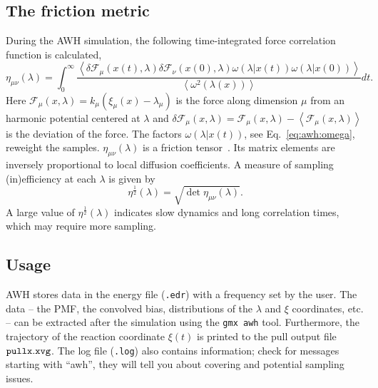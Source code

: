 \subsection{The friction metric}\label{sec:awh:friction}
During the AWH simulation, the following time-integrated force correlation function is calculated,
\newcommand{\av}[1]{\left<{#1}\right>}
\begin{equation} \label{eq:awh:metric}
\eta_{\mu\nu}(\lambda) =
\int_0^\infty
\frac{
\av{\delta \mathcal{F}_{\mu}(x(t),\lambda)
\delta \mathcal{F}_\nu(x(0),\lambda)
\omega(\lambda|x(t)) \omega(\lambda|x(0))}}
{\av{\omega^2(\lambda(x))}}
dt.
\end{equation}
Here $\mathcal F_\mu(x,\lambda) = k_\mu (\xi_\mu(x) - \lambda_\mu)$ 
is the force along dimension $\mu$ from an harmonic potential centered at $\lambda$
and $\delta \mathcal F_\mu(x,\lambda) = \mathcal F_\mu(x,\lambda) - \av{\mathcal F_\mu(x,\lambda)}$
is the deviation of the force.
The factors $\omega(\lambda|x(t))$, see Eq.~\ref{eq:awh:omega}, reweight the samples.
$\eta_{\mu\nu}(\lambda)$ is a friction tensor~\cite{sivak2012thermodynamic}.
Its matrix elements are inversely proportional to local diffusion coefficients.
A measure of sampling (in)efficiency at each $\lambda$ is given by
\begin{equation}\label{eq:awh:sqrt-metric}
\eta^{\frac{1}{2}}(\lambda) = \sqrt{\det\eta_{\mu\nu}(\lambda)}.
\end{equation}
A large value of  $\eta^{\frac{1}{2}}(\lambda)$ indicates slow dynamics and long correlation times,
which may require more sampling.

\subsection{Usage}\label{sec:awh:usage}

AWH stores data in the energy file ({\tt .edr}) with a frequency set by the user.
The data -- the PMF, the convolved bias, distributions of the $\lambda$ and $\xi$ coordinates, etc. -- 
can be extracted after the simulation using the {\tt gmx awh} tool.
Furthermore, the trajectory of the reaction coordinate $\xi(t)$ is printed to the pull output file ${\tt pullx.xvg}$.
The log file ({\tt .log})  also contains information;
check for messages starting with ``awh'', they will tell you about covering and potential sampling issues.

